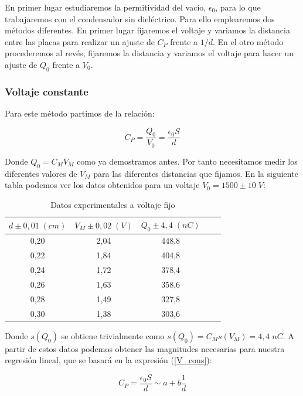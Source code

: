 \documentclass[a4paper,12pt,titlepage]{article}
\begin{document}
En primer lugar estudiaremos la permitividad del vacío, $\epsilon_0$, para lo que trabajaremos con el condensador sin dieléctrico. Para ello emplearemos dos métodos diferentes. En primer lugar fijaremos el voltaje y variamos la distancia entre las placas para realizar un ajuste de $C_P$ frente a $1/d$. En el otro método procederemos al revés, fijaremos la distancia y variamos el voltaje para hacer un ajuste de $Q_0$ frente a $V_0$.

\subsubsection{Voltaje constante}

Para este método partimos de la relación:

\begin{equation}
    C_P = \frac{Q_0}{V_0} = \frac{\epsilon_0 S}{d}
    \label{V_cons}
\end{equation}

Donde $Q_0=C_M V_M$ como ya demostramos antes. Por tanto necesitamos medir los diferentes valores de $V_M$ para las diferentes distancias que fijamos. En la siguiente tabla podemos ver los datos obtenidos para un voltaje $V_0 =1500\pm10 \;V$:

\begin{table}[h!]
\centering
\begin{tabular}{|c|c|c|c|c|}
\hline
$d\pm 0,01\;(cm)$ & $V_M\pm0,02\;(V)$ & $Q_0\pm 4,4\;(nC)$  \\ \hline
0,20 & 2,04 & 448,8 \\ \hline 
0,22 & 1,84 & 404,8 \\ \hline 
0,24 & 1,72 & 378,4\\ \hline 
0,26 & 1,63 & 358,6 \\ \hline 
0,28 & 1,49 & 327,8 \\ \hline 
0,30 & 1,38 & 303,6 \\ \hline
\end{tabular}
\caption{Datos experimentales a voltaje fijo}
\label{tab:my-table}
\end{table}

Donde $s(Q_0)$ se obtiene trivialmente como $s(Q_0) = C_M s(V_M) = 4,4 \;nC$. A partir de estos datos podemos obtener las magnitudes necesarias para nuestra regresión lineal, que se basará en la  expresión (\ref{V_cons}):

\begin{equation}
    C_P = \frac{\epsilon_0S}{d} \sim a+ b\frac{1}{d}
\end{equation}
\end{document}
